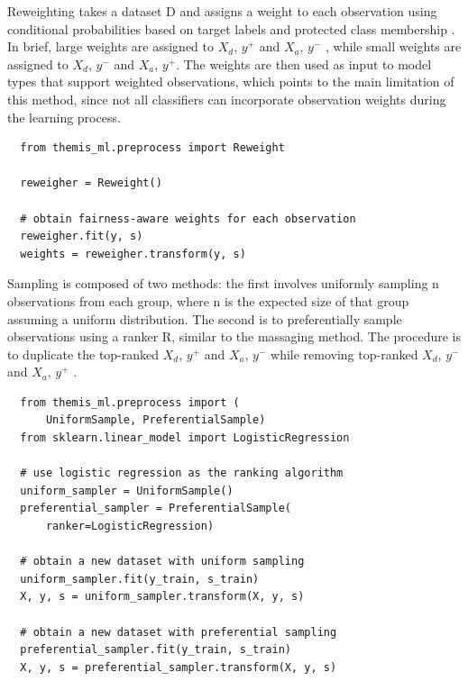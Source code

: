 \documentclass{acm_proc_article-sp}
\begin{document}
Reweighting takes a dataset D and assigns a weight to each observation using
conditional probabilities based on target labels and protected class membership
\cite{kamiran2012data}. In brief, large weights are assigned to \(X_d\),
\(y^{+}\) and \(X_a\), \(y^{-}\) , while small weights are assigned to \(X_d\),
\(y^{-}\) and \(X_a\), \(y^{+}\). The weights are then used as input to model
types that support weighted observations, which points to the main limitation of
this method, since not all classifiers can incorporate observation weights
during the learning process.

\begin{verbatim}
  from themis_ml.preprocess import Reweight

  reweigher = Reweight()

  # obtain fairness-aware weights for each observation
  reweigher.fit(y, s)
  weights = reweigher.transform(y, s)
\end{verbatim}

Sampling is composed of two methods: the first involves uniformly sampling n
observations from each group, where n is the expected size of that group
assuming a uniform distribution. The second is to preferentially sample
observations using a ranker R, similar to the massaging method. The procedure is
to duplicate the top-ranked \(X_d\), \(y^{+}\) and \(X_a\), \(y^{-}\) while
removing top-ranked \(X_d\), \(y^{-}\) and \(X_a\), \(y^{+}\)
\cite{kamiran2012data}.

\begin{verbatim}
  from themis_ml.preprocess import (
      UniformSample, PreferentialSample)
  from sklearn.linear_model import LogisticRegression

  # use logistic regression as the ranking algorithm
  uniform_sampler = UniformSample()
  preferential_sampler = PreferentialSample(
      ranker=LogisticRegression)

  # obtain a new dataset with uniform sampling
  uniform_sampler.fit(y_train, s_train)
  X, y, s = uniform_sampler.transform(X, y, s)

  # obtain a new dataset with preferential sampling
  preferential_sampler.fit(y_train, s_train)
  X, y, s = preferential_sampler.transform(X, y, s)
\end{verbatim}
\end{document}
